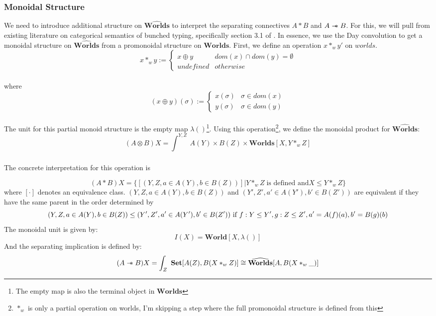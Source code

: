 \documentclass{article}
\newcommand\sep{\mathrel{-\mkern-6mu*}}
\newcommand{\worlds}{\widehat{\mathbf{Worlds}}}
\begin{document}
  \subsubsection{Monoidal Structure}

  We need to introduce additional structure on $\worlds$ to interpret the separating connectives $A * B$ and $A\sep B$. For this, we will pull from existing literature on categorical semantics of bunched typing, specifically section 3.1 of \cite{pym_semantics_2002}. In essence, we use the Day convolution \cite{nlabDayConv} to get a monoidal structure on $\worlds$ from a promonoidal structure on $\mathbf{Worlds}$. First, we define an operation $x *_w y'$ on $worlds$. 
\[ 
x *_w y  :=\begin{cases} 
      x \oplus y & dom(x) \cap dom(y) = \emptyset \\
      undefined & otherwise 
      \end{cases}
\]
\\
where \[ 
(x \oplus y)(\sigma)  :=\begin{cases} 
      x(\sigma) & \sigma \in dom(x) \\
      y(\sigma) & \sigma \in dom(y)
      \end{cases}
\]
\\
The unit for this partial monoid structure is the empty map $\lambda()$\footnote{The empty map is also the terminal object in $\mathbf{Worlds}$}.
Using this operation\footnote{$*_w$ is only a partial operation on worlds, I'm skipping a step where the full promonoidal structure is defined from this}, we define the monoidal product for $\worlds$: 
\[
(A \otimes B) X = \int_{}^{Y,Z}\ A(Y) \times B(Z) \times \mathbf{Worlds}[X,Y *_w Z]
\]
\\
The concrete interpretation for this operation is

\[
(A * B) X = \{[(Y,Z,a \in A(Y), b \in B(Z))] | Y *_w Z \;\textrm{is defined and} X \leq Y *_w Z \}
\]
where $[\cdot]$ denotes an equivalence class. $(Y,Z,a \in A(Y), b \in B(Z))$ and $(Y', Z', a' \in A(Y'), b' \in B(Z'))$ are equivalent if they have the same parent in the order determined by
\[
(Y,Z,a \in A(Y), b \in B(Z)) \leq (Y', Z', a' \in A(Y'), b' \in B(Z')) \\ \textrm{ if } \\
 f: Y \leq Y', g: Z \leq Z', a' = A(f)(a), b' = B(g)(b)
\]
The monoidal unit is given by: 
\[ 
    I(X) = \mathbf{World}[X , \lambda()]
\]
And the separating implication is defined by: 
\[
(A \sep B) X = \int_{Z}^{}\ \mathbf{Set}[A(Z), B(X *_w Z)] \cong \worlds[A, B(X*_w\_)]
\]
\end{document}
